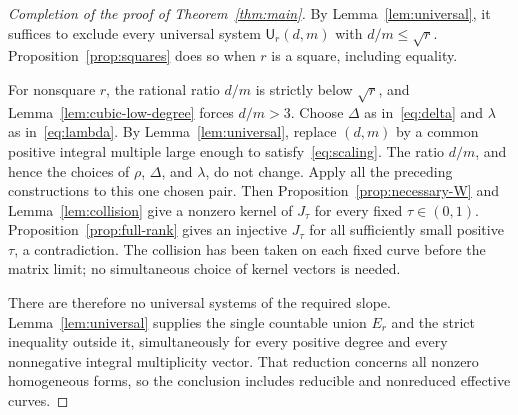 \begin{proof}[Completion of the proof of Theorem~\ref{thm:main}]
By Lemma~\ref{lem:universal}, it suffices to exclude every universal
system $\mathsf U_r(d,m)$ with $d/m\le\sqrt r$.
Proposition~\ref{prop:squares} does so when $r$ is a square,
including equality.

For nonsquare $r$, the rational ratio $d/m$ is strictly below
$\sqrt r$, and Lemma~\ref{lem:cubic-low-degree} forces $d/m>3$.
Choose $\Delta$ as in~\eqref{eq:delta} and $\lambda$ as
in~\eqref{eq:lambda}. By Lemma~\ref{lem:universal}, replace
$(d,m)$ by a common positive integral multiple large enough to
satisfy~\eqref{eq:scaling}. The ratio $d/m$, and hence the choices
of $\rho$, $\Delta$, and $\lambda$, do not change. Apply all the
preceding constructions to this one chosen pair. Then
Proposition~\ref{prop:necessary-W} and Lemma~\ref{lem:collision}
give a nonzero kernel of $J_\tau$ for every fixed $\tau\in(0,1)$.
Proposition~\ref{prop:full-rank} gives an injective $J_\tau$ for
all sufficiently small positive $\tau$, a contradiction. The collision
has been taken on each fixed curve before the matrix limit; no
simultaneous choice of kernel vectors is needed.

There are therefore no universal systems of the required slope.
Lemma~\ref{lem:universal} supplies the single countable union $E_r$
and the strict inequality outside it, simultaneously for every
positive degree and every nonnegative integral multiplicity vector.
That reduction concerns all nonzero homogeneous forms, so the
conclusion includes reducible and nonreduced effective curves.
\end{proof}
